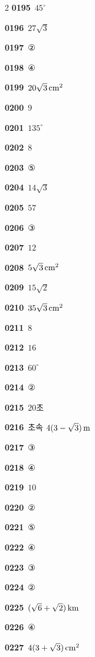 \documentclass[10pt,a4paper]{article}
\begin{document}
\begin{multicols}{2}
\noindent\textbf{0195}\ $45^\circ$\par
\noindent\textbf{0196}\ $27\sqrt{3}$\par
\noindent\textbf{0197}\ ②\par
\noindent\textbf{0198}\ ④\par
\noindent\textbf{0199}\ $20\sqrt{3}\mkern3mu \mathrm{cm}^2$\par
\noindent\textbf{0200}\ $9$\par
\noindent\textbf{0201}\ $135^\circ$\par
\noindent\textbf{0202}\ $8$\par
\noindent\textbf{0203}\ ⑤\par
\noindent\textbf{0204}\ $14\sqrt{3}$\par
\noindent\textbf{0205}\ $57$\par
\noindent\textbf{0206}\ ③\par
\noindent\textbf{0207}\ $12$\par
\noindent\textbf{0208}\ $5\sqrt{3}\mkern3mu \mathrm{cm}^2$\par
\noindent\textbf{0209}\ $15\sqrt{2}$\par
\noindent\textbf{0210}\ $35\sqrt{3}\mkern3mu \mathrm{cm}^2$\par
\noindent\textbf{0211}\ $8$\par
\noindent\textbf{0212}\ $16$\par
\noindent\textbf{0213}\ $60^\circ$\par
\noindent\textbf{0214}\ ②\par
\noindent\textbf{0215}\ $20$초\par
\noindent\textbf{0216}\ 초속 $4(3-\sqrt{3})\mkern3mu \mathrm{m}$\par
\noindent\textbf{0217}\ ③\par
\noindent\textbf{0218}\ ④\par
\noindent\textbf{0219}\ $10$\par
\noindent\textbf{0220}\ ②\par
\noindent\textbf{0221}\ ⑤\par
\noindent\textbf{0222}\ ④\par
\noindent\textbf{0223}\ ③\par
\noindent\textbf{0224}\ ②\par
\noindent\textbf{0225}\ $(\sqrt{6}+\sqrt{2})\mkern3mu \mathrm{km}$\par
\noindent\textbf{0226}\ ④\par
\noindent\textbf{0227}\ $4(3+\sqrt{3})\mkern3mu \mathrm{cm}^2$\par

\end{multicols}
\end{document}
